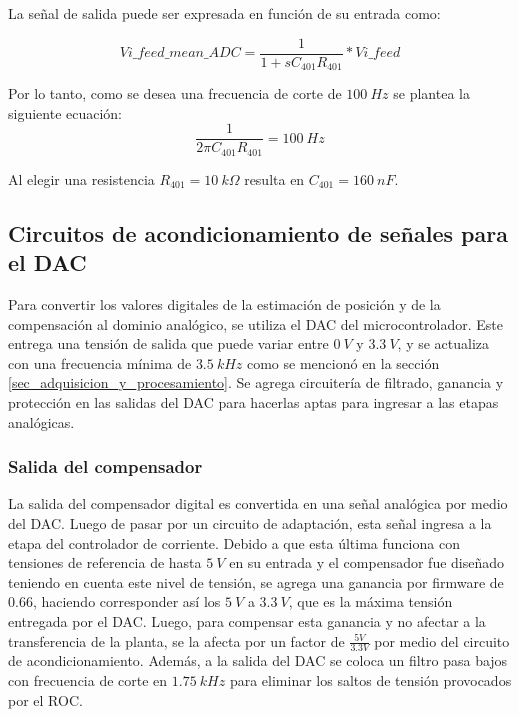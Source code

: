 La señal de salida puede ser expresada en función de su entrada como:

\begin{equation*}
	Vi\_feed\_mean\_ADC=\frac{1}{1+sC_{401}R_{401}}*Vi\_feed
\end{equation*}

Por lo tanto, como se desea una frecuencia de corte de $100\:Hz$ se plantea la siguiente ecuación:
\begin{equation*} 
	\frac{1}{2\pi C_{401}R_{401}}=100\:Hz
\end{equation*}

Al elegir una resistencia $R_{401}=10\:k\Omega$ resulta en $C_{401}=160\:nF$.


\subsection{Circuitos de acondicionamiento de señales para el DAC}

 Para convertir los valores digitales de la estimación de posición y de la compensación al dominio analógico, se utiliza el DAC del microcontrolador. Este entrega una tensión de salida que puede variar entre $0\:V$ y $3.3\:V$, y se actualiza con una frecuencia mínima de $3.5\:kHz$ como se mencionó en la sección \ref{sec_adquisicion_y_procesamiento}. Se agrega circuitería de filtrado, ganancia y protección en las salidas del DAC para hacerlas aptas para ingresar a las etapas analógicas.
 
\subsubsection{Salida del compensador}

La salida del compensador digital es convertida en una señal analógica por medio del DAC. Luego de pasar por un circuito de adaptación, esta señal ingresa a la etapa del controlador de corriente. Debido a que esta última funciona con tensiones de referencia de hasta $5\:V$ en su entrada y el compensador fue diseñado teniendo en cuenta este nivel de tensión, se agrega una ganancia por firmware de $0.66$, haciendo corresponder así los $5\:V$ a $3.3\:V$, que es la máxima tensión entregada por el DAC. Luego, para compensar esta ganancia y no afectar a la transferencia de la planta, se la afecta por un factor de $\frac{5V}{3.3V}$ por medio del circuito de acondicionamiento. Además, a la salida del DAC se coloca un filtro pasa bajos con frecuencia de corte en $1.75\:kHz$ para eliminar los saltos de tensión provocados por el ROC.

